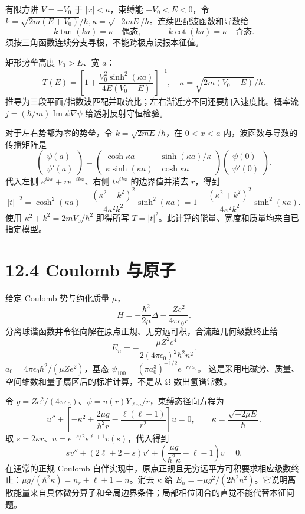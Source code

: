 \documentclass[
  11pt,
  oneside]{book}
\begin{document}
有限方阱 \(V=-V_0\) 于 \(|x|<a\)，束缚能 \(-V_0<E<0\)，令
\(k=\sqrt{2m(E+V_0)}/\hbar,\kappa=\sqrt{-2mE}/\hbar\)。连续匹配波函数和导数给
\[
k\tan(ka)=\kappa\quad\text{偶态},\qquad
-k\cot(ka)=\kappa\quad\text{奇态}.
\] 须按三角函数连续分支寻根，不能跨极点误报本征值。

矩形势垒高度 \(V_0>E\)、宽 \(a\)： \[
T(E)=\left[1+
\frac{V_0^2\sinh^2(\kappa a)}{4E(V_0-E)}
\right]^{-1},\quad
\kappa=\sqrt{2m(V_0-E)}/\hbar.
\]
推导为三段平面/指数波匹配并取流比；左右渐近势不同还要加入速度比。概率流
\(j=(\hbar/m)\operatorname{Im}\bar\psi\nabla\psi\) 给透射反射守恒检验。

对于左右势都为零的势垒，令 \(k=\sqrt{2mE}/\hbar\)，在 \(0<x<a\)
内，波函数与导数的传播矩阵是 \[
\begin{pmatrix}\psi(a)\\\psi'(a)\end{pmatrix}
=\begin{pmatrix}\cosh\kappa a&\sinh(\kappa a)/\kappa\\
\kappa\sinh(\kappa a)&\cosh\kappa a\end{pmatrix}
\begin{pmatrix}\psi(0)\\\psi'(0)\end{pmatrix}.
\] 代入左侧 \(e^{ikx}+re^{-ikx}\)、右侧 \(te^{ikx}\) 的边界值并消去
\(r\)，得到 \[
|t|^{-2}=\cosh^2(\kappa a)+
\frac{(\kappa^2-k^2)^2}{4\kappa^2k^2}\sinh^2(\kappa a)
=1+\frac{(\kappa^2+k^2)^2}{4\kappa^2k^2}\sinh^2(\kappa a).
\] 使用 \(\kappa^2+k^2=2mV_0/\hbar^2\) 即得所写
\(T=|t|^2\)。此计算的能量、宽度和质量均来自已指定模型。

\hypertarget{coulomb-ux4e0eux539fux5b50}{%
\section{12.4 Coulomb 与原子}\label{coulomb-ux4e0eux539fux5b50}}

给定 Coulomb 势与约化质量 \(\mu\)， \[
H=-\frac{\hbar^2}{2\mu}\Delta-\frac{Ze^2}{4\pi\epsilon_0r}.
\] 分离球谐函数并令径向解在原点正规、无穷远可积，合流超几何级数终止给 \[
E_n=-\frac{\mu Z^2e^4}{2(4\pi\epsilon_0)^2\hbar^2n^2}.
\] \(a_0=4\pi\epsilon_0\hbar^2/(\mu Ze^2)\)，基态
\(\psi_{100}=(\pi a_0^3)^{-1/2}e^{-r/a_0}\)。
这是采用电磁势、质量、空间维数和量子扇区后的标准计算，不是从 Ω
数出氢谱常数。

令
\(g=Ze^2/(4\pi\epsilon_0)\)、\(\psi=u(r)Y_{\ell m}/r\)，束缚态径向方程为
\[
u''+\left[-\kappa^2+\frac{2\mu g}{\hbar^2r}
-\frac{\ell(\ell+1)}{r^2}\right]u=0,
\qquad \kappa=\frac{\sqrt{-2\mu E}}{\hbar}.
\] 取 \(s=2\kappa r\)、\(u=e^{-s/2}s^{\ell+1}v(s)\)，代入得到 \[
s v''+(2\ell+2-s)v'+\left(\frac{\mu g}{\hbar^2\kappa}-\ell-1\right)v=0.
\] 在通常的正规 Coulomb
自伴实现中，原点正规且无穷远平方可积要求相应级数终止：\(\mu g/(\hbar^2\kappa)=n_r+\ell+1=n\)。消去
\(\kappa\) 给
\(E_n=-\mu g^2/(2\hbar^2n^2)\)。它说明离散能量来自具体微分算子和全局边界条件；局部相位闭合的直觉不能代替本征问题。
\end{document}
